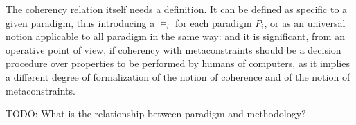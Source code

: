 The coherency relation itself needs a definition. It can be defined as specific to a given paradigm, thus introducing a $\models_i$ for each paradigm $P_i$, or as an universal notion applicable to all paradigm in the same way: and it is significant, from an operative point of view, if coherency with metaconstraints should be a decision procedure over properties to be performed by humans of computers, as it implies a different degree of formalization of the notion of coherence and of the notion of metaconstraints.

TODO: What is the relationship between paradigm and methodology?
